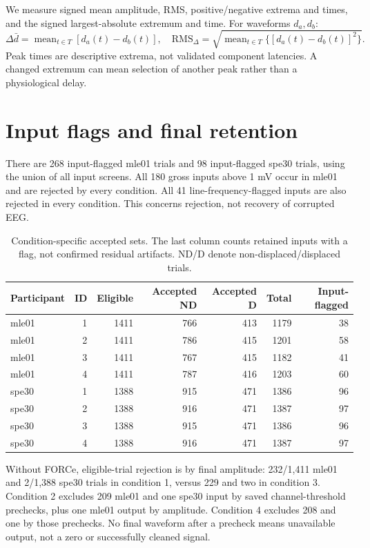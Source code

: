 \documentclass[11pt,a4paper]{article}
\begin{document}
We measure signed mean amplitude, RMS, positive/negative extrema and times, and the signed largest-absolute extremum and time. For waveforms $d_a,d_b$:
\[
\Delta\bar d=\operatorname{mean}_{t\in T}[d_a(t)-d_b(t)],\quad
\mathrm{RMS}_{\Delta}=\sqrt{\operatorname{mean}_{t\in T}\{[d_a(t)-d_b(t)]^2\}}.
\]
Peak times are descriptive extrema, not validated component latencies. A changed extremum can mean selection of another peak rather than a physiological delay.
\clearpage
\section{Input flags and final retention}
There are 268 input-flagged mle01 trials and 98 input-flagged spe30 trials, using the union of all input screens. All 180 gross inputs above 1 mV occur in mle01 and are rejected by every condition. All 41 line-frequency-flagged inputs are also rejected in every condition. This concerns rejection, not recovery of corrupted EEG.
\begin{table}[H]\centering\small
\begin{tabular}{@{}lrrrrrr@{}}\toprule
Participant & ID & Eligible & Accepted ND & Accepted D & Total & Input-flagged\\\midrule
mle01 & 1 & 1411 & 766 & 413 & 1179 & 38 \\
mle01 & 2 & 1411 & 786 & 415 & 1201 & 58 \\
mle01 & 3 & 1411 & 767 & 415 & 1182 & 41 \\
mle01 & 4 & 1411 & 787 & 416 & 1203 & 60 \\
spe30 & 1 & 1388 & 915 & 471 & 1386 & 96 \\
spe30 & 2 & 1388 & 916 & 471 & 1387 & 97 \\
spe30 & 3 & 1388 & 915 & 471 & 1386 & 96 \\
spe30 & 4 & 1388 & 916 & 471 & 1387 & 97 \\
\bottomrule\end{tabular}
\caption{Condition-specific accepted sets. The last column counts retained inputs with a flag, not confirmed residual artifacts. ND/D denote non-displaced/displaced trials.}\label{tab:retention}
\end{table}
Without FORCe, eligible-trial rejection is by final amplitude: 232/1,411 mle01 and 2/1,388 spe30 trials in condition 1, versus 229 and two in condition 3. Condition 2 excludes 209 mle01 and one spe30 input by saved channel-threshold prechecks, plus one mle01 output by amplitude. Condition 4 excludes 208 and one by those prechecks. No final waveform after a precheck means unavailable output, not a zero or successfully cleaned signal.
\end{document}

